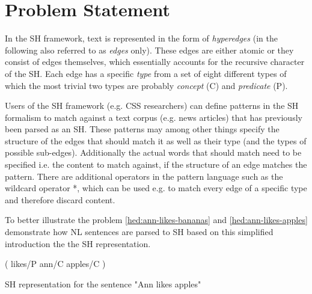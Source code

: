 \documentclass[11pt]{scrreprt}
\begin{document}
%
%




\section{Problem Statement}
In the SH framework, text is represented in the form of \textit{hyperedges} (in the following also referred to as \textit{edges} only). These edges are either atomic or they consist of edges themselves, which essentially accounts for the recursive character of the SH. Each edge has a specific \textit{type} from a set of eight different types of which the most trivial two types are probably \textit{concept} (\textsf{C}) and \textit{predicate} (\textsf{P}). 

Users of the SH framework (e.g. CSS researchers) can define patterns in the SH formalism to match against a text corpus (e.g. news articles) that has previously been parsed as an SH. These patterns may among other things specify the structure of the edges that should match it as well as their type (and the types of possible sub-edges). Additionally the actual words that should match need to be specified i.e. the content to match against, if the structure of an edge matches the pattern. 
There are additional operators in the pattern language such as the wildcard operator \textsf{*}, which can be used e.g. to match every edge of a specific type and therefore discard content.

To better illustrate the problem \cref{hed:ann-likes-bananas} and \cref{hed:ann-likes-apples} demonstrate how NL sentences are parsed to SH based on this simplified introduction the the SH representation.

\begin{hedge}
  \normalfont\sffamily
  \centering
  ( likes/P ann/C apples/C ) 
  \caption{SH representation for the sentence "Ann likes apples"}
  \label{hed:ann-likes-apples}
\end{hedge}
\end{document}
